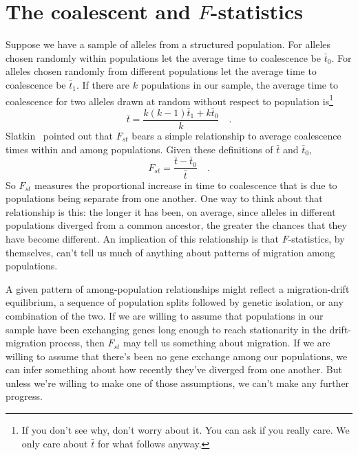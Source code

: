 \section*{The coalescent and $F$-statistics}

Suppose we have a sample of alleles from a structured population. For
alleles chosen randomly within populations let the average time to
coalescence be $\bar t_0$. For alleles chosen randomly from different
populations let the average time to coalescence be $\bar t_1$. If
there are $k$ populations in our sample, the average time to
coalescence for two alleles drawn at random without respect to
population is\footnote{If you don't see why, don't worry about it. You
can ask if you really care. We only care about $\bar t$ for what
follows anyway.}
\[
\bar t = \frac{k(k-1)\bar t_1 + k\bar t_0}
              {k} \quad .
\]
Slatkin~\cite{Slatkin-1991} pointed out that $F_{st}$ bears a simple
relationship to average coalescence times within and among
populations. Given these definitions of $\bar t$ and $\bar t_0$,
\[
F_{st} = \frac{\bar t - \bar t_0}{\bar t} \quad .
\]
So $F_{st}$ measures the proportional increase in time to coalescence
that is due to populations being separate from one another. One way to
think about that relationship is this: the longer it has been, on
average, since alleles in different populations diverged from a common
ancestor, the greater the chances that they have become different. An
implication of this relationship is that $F$-statistics, by
themselves, can't tell us much of anything about patterns of migration
among populations. 

A given pattern of among-population relationships might reflect a
migration-drift equilibrium, a sequence of population splits followed
by genetic isolation, or any combination of the two. If we are willing
to assume that populations in our sample have been exchanging genes
long enough to reach stationarity in the drift-migration process, then
$F_{st}$ may tell us something about migration. If we are willing to
assume that there's been no gene exchange among our populations, we
can infer something about how recently they've diverged from one
another. But unless we're willing to make one of those assumptions, we
can't make any further progress.

